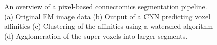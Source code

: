 \begin{figure}[t]
	\centering
	\caption{An overview of a pixel-based connectomics segmentation pipeline. (a) Original EM image data (b) Output of a CNN predicting voxel affinities (c) Clustering of the affinities using a watershed algorithm (d) Agglomeration of the super-voxels into larger segments.}
	\label{fig:pipeline}
\end{figure}

